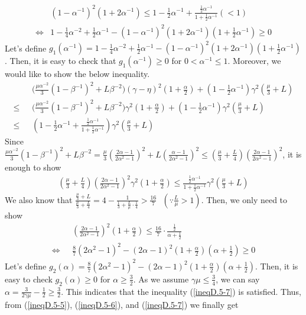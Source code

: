 \begin{align} \label{ineqD.5-6}
    &(1-\alpha^{-1})^2(1+2\alpha^{-1}) \leq 1-\frac{1}{2}\alpha^{-1}+\frac{\frac{1}{2}\alpha^{-1}}{1+\frac{1}{2}\alpha^{-1}} \textrm{}(<1) \\
    \Leftrightarrow \textrm{} &1-\frac{1}{4}\alpha^{-2}+\frac{1}{2}\alpha^{-1} - (1-\alpha^{-1})^2(1+2\alpha^{-1})(1+\frac{1}{2}\alpha^{-1}) \geq 0 \nonumber
\end{align}
Let's define $g_1(\alpha^{-1}) = 1-\frac{1}{4}\alpha^{-2}+\frac{1}{2}\alpha^{-1} - (1-\alpha^{-1})^2(1+2\alpha^{-1})(1+\frac{1}{2}\alpha^{-1})$. Then, it is easy to check that $g_1(\alpha^{-1}) \geq 0$ for $0 < \alpha^{-1} \leq 1$. Moreover, we would like to show the below inequality.
\begin{align} \label{ineqD.5-7}
    &\Big(\frac{\mu\alpha^{-2}}{3}(1-\beta^{-1})^2 + L\beta^{-2}\Big)(\gamma-\eta)^2(1+\frac{\alpha}{2}) + (1-\frac{1}{2}\alpha^{-1})\gamma^2(\frac{\mu}{3}+L) \nonumber \\
    \leq \textrm{ } &\Big(\frac{\mu\alpha^{-2}}{3}(1-\beta^{-1})^2 + L\beta^{-2}\Big)\gamma^2(1+\frac{\alpha}{2}) + (1-\frac{1}{2}\alpha^{-1})\gamma^2(\frac{\mu}{3}+L) \nonumber\\
    \leq \textrm{ } &(1-\frac{1}{2}\alpha^{-1}+\frac{\frac{1}{2}\alpha^{-1}}{1+\frac{1}{2}\alpha^{-1}})\gamma^2(\frac{\mu}{3}+L)
\end{align}
Since $\frac{\mu\alpha^{-2}}{3}(1-\beta^{-1})^2 + L\beta^{-2} = \frac{\mu}{3}(\frac{2\alpha-1}{2\alpha^2-1})^2 + L(\frac{\alpha-1}{2\alpha^2-1})^2 \leq (\frac{\mu}{3}+\frac{L}{4})(\frac{2\alpha-1}{2\alpha^2-1})^2$, it is enough to show
\begin{align*}
    (\frac{\mu}{3}+\frac{L}{4})(\frac{2\alpha-1}{2\alpha^2-1})^2\gamma^2 (1+\frac{\alpha}{2}) \leq \frac{\frac{1}{2}\alpha^{-1}}{1+\frac{1}{2}\alpha^{-1}} \gamma^2 (\frac{\mu}{3}+L)
\end{align*}
We also know that $\frac{\frac{\mu}{3}+L}{\frac{\mu}{3}+\frac{L}{4}}=4-\frac{1}{\frac{1}{3}+\frac{L}{\mu}\cdot\frac{1}{4}} > \frac{16}{7} \textrm{ }(\because \frac{L}{\mu}>1)$. Then, we only need to show
\begin{align*}
    &(\frac{2\alpha-1}{2\alpha^2-1})^2(1+\frac{\alpha}{2}) \leq \frac{16}{7}\cdot\frac{\frac{1}{2}}{\alpha+\frac{1}{2}} \\
    \Leftrightarrow \textrm{ } &\frac{8}{7}(2\alpha^2 -1)^2 - (2\alpha-1)^2(1+\frac{\alpha}{2})(\alpha+\frac{1}{2}) \geq 0
\end{align*}
Let's define $g_2(\alpha) = \frac{8}{7}(2\alpha^2 -1)^2 - (2\alpha-1)^2(1+\frac{\alpha}{2})(\alpha+\frac{1}{2})$. Then, it is easy to check $g_2(\alpha) \geq 0$ for $\alpha \geq \frac{3}{2}$. As we assume $\gamma\mu \leq \frac{3}{4}$, we can say $\alpha = \frac{3}{2\gamma\mu}-\frac{1}{2} \geq \frac{3}{2}$. This indicates that the inequality (\ref{ineqD.5-7}) is satisfied. Thus, from (\ref{ineqD.5-5}), (\ref{ineqD.5-6}), and (\ref{ineqD.5-7}) we finally get
